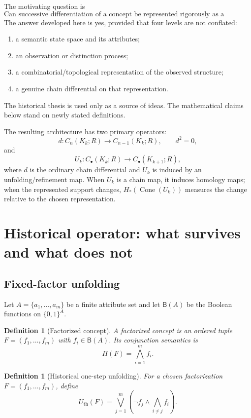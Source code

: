 \documentclass[11pt]{article}
\newtheorem{definition}[theorem]{Definition}
\newcommand{\Cone}{\operatorname{Cone}}
\begin{document}
The motivating question is
\[
\boxed{\text{Can successive differentiation of a concept be represented rigorously as a transformation between complexes?}}
\]
The answer developed here is yes, provided that four levels are not conflated:
\begin{enumerate}[label=(\roman*)]
\item a semantic state space and its attributes;
\item an observation or distinction process;
\item a combinatorial/topological representation of the observed structure;
\item a genuine chain differential on that representation.
\end{enumerate}
The historical thesis is used only as a source of ideas.  The mathematical claims below stand on newly stated definitions.

The resulting architecture has two primary operators:
\[
 d:C_n(K_k;R)\longrightarrow C_{n-1}(K_k;R),\qquad d^2=0,
\]
and
\[
 U_k:C_\bullet(K_k;R)\longrightarrow C_\bullet(K_{k+1};R),
\]
where $d$ is the ordinary chain differential and $U_k$ is induced by an unfolding/refinement map.  When $U_k$ is a chain map, it induces homology maps; when the represented support changes, $H_*(\Cone(U_k))$ measures the change relative to the chosen representation.

\section{Historical operator: what survives and what does not}

\subsection{Fixed-factor unfolding}

Let $A=\{a_1,\dots,a_m\}$ be a finite attribute set and let $\mathsf B(A)$ be the Boolean functions on $\{0,1\}^A$.

\begin{definition}[Factorized concept]
A factorized concept is an ordered tuple $F=(f_1,\dots,f_m)$ with $f_i\in\mathsf B(A)$.  Its conjunction semantics is
\[
\Pi(F)=\bigwedge_{i=1}^m f_i.
\]
\end{definition}

\begin{definition}[Historical one-step unfolding]
For a chosen factorization $F=(f_1,\dots,f_m)$, define
\[
U_{\mathrm{th}}(F)
=\bigvee_{j=1}^m\left(\neg f_j\wedge\bigwedge_{i\neq j}f_i\right).
\]
\end{definition}
\end{document}
